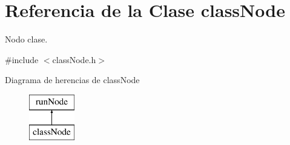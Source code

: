 \hypertarget{classclassNode}{\section{Referencia de la Clase class\-Node}
\label{classclassNode}
}


Nodo clase.  




{\ttfamily \#include $<$class\-Node.\-h$>$}

Diagrama de herencias de class\-Node\begin{figure}[H]
\begin{center}
\leavevmode
\includegraphics[height=2.000000cm]{classclassNode}
\end{center}
\end{figure}
